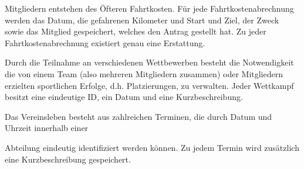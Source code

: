 \documentclass{lehramt-informatik-aufgabe}
\begin{document}
Mitgliedern entstehen des Öfteren Fahrtkosten. Für jede
Fahrtkostenabrechnung werden das Datum, die gefahrenen Kilometer und
Start und Ziel, der Zweck sowie das Mitglied gespeichert, welches den
Antrag gestellt hat. Zu jeder Fahrtkostenabrechnung existiert genau eine
Erstattung.

Durch die Teilnahme an verschiedenen Wettbewerben besteht die
Notwendigkeit die von einem Team (also mehreren Mitgliedern zusammen)
oder Mitgliedern erzielten sportlichen Erfolge, d.h. Platzierungen, zu
verwalten. Jeder Wettkampf besitzt eine eindeutige ID, ein Datum und
eine Kurzbeschreibung.

Das Vereinsleben besteht aus zahlreichen Terminen, die durch Datum und
Uhrzeit innerhalb einer

Abteilung eindeutig identifiziert werden können. Zu jedem Termin wird
zusätzlich eine Kurzbeschreibung gespeichert.
\end{document}
